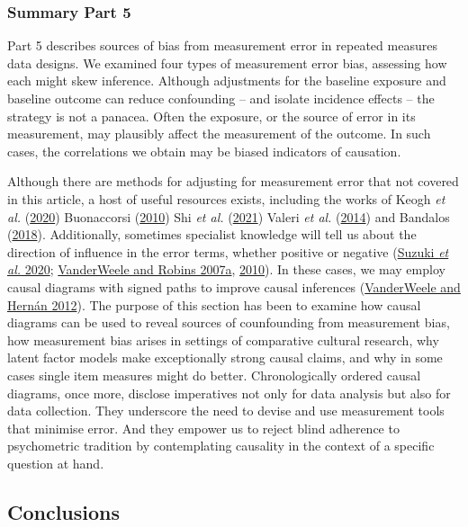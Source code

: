 \documentclass[
  singlecolumn]{article}
\begin{document}
\hypertarget{summary-part-5}{%
\subsubsection{Summary Part 5}\label{summary-part-5}}

Part 5 describes sources of bias from measurement error in repeated
measures data designs. We examined four types of measurement error bias,
assessing how each might skew inference. Although adjustments for the
baseline exposure and baseline outcome can reduce confounding -- and
isolate incidence effects -- the strategy is not a panacea. Often the
exposure, or the source of error in its measurement, may plausibly
affect the measurement of the outcome. In such cases, the correlations
we obtain may be biased indicators of causation.

Although there are methods for adjusting for measurement error that not
covered in this article, a host of useful resources exists, including
the works of Keogh \emph{et al.}
(\protect\hyperlink{ref-keogh2020}{2020}) Buonaccorsi
(\protect\hyperlink{ref-buonaccorsi2010}{2010}) Shi \emph{et al.}
(\protect\hyperlink{ref-shi2021}{2021}) Valeri \emph{et al.}
(\protect\hyperlink{ref-valeri2014}{2014}) and Bandalos
(\protect\hyperlink{ref-bandalos2018}{2018}). Additionally, sometimes
specialist knowledge will tell us about the direction of influence in
the error terms, whether positive or negative
(\protect\hyperlink{ref-suzuki2020}{Suzuki \emph{et al.} 2020};
\protect\hyperlink{ref-vanderweele2007a}{VanderWeele and Robins 2007a},
\protect\hyperlink{ref-vanderweele2010}{2010}). In these cases, we may
employ causal diagrams with signed paths to improve causal inferences
(\protect\hyperlink{ref-vanderweele2012}{VanderWeele and Hernán 2012}).
The purpose of this section has been to examine how causal diagrams can
be used to reveal sources of counfounding from measurement bias, how
measurement bias arises in settings of comparative cultural research,
why latent factor models make exceptionally strong causal claims, and
why in some cases single item measures might do better. Chronologically
ordered causal diagrams, once more, disclose imperatives not only for
data analysis but also for data collection. They underscore the need to
devise and use measurement tools that minimise error. And they empower
us to reject blind adherence to psychometric tradition by contemplating
causality in the context of a specific question at hand.

\hypertarget{conclusions}{%
\subsection{Conclusions}\label{conclusions}}
\end{document}
